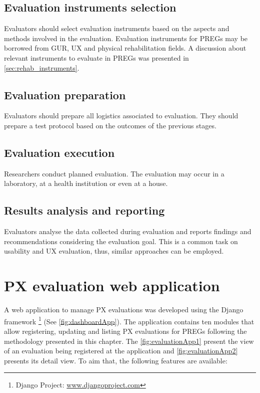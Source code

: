 \subsection{Evaluation instruments selection}
Evaluators should select evaluation instruments based on the aspects and methods involved in the evaluation. Evaluation instruments for \acp{PREG} may be borrowed from \ac{GUR}, \ac{UX} and physical rehabilitation fields. A discussion about relevant instruments to evaluate in \acp{PREG} was presented in \autoref{sec:rehab_instruments}.

\subsection{Evaluation preparation}
Evaluators should prepare all logistics associated to evaluation. They should prepare a test protocol based on the outcomes of the previous stages.

\subsection{Evaluation execution}
Researchers conduct planned evaluation. The evaluation may occur in a laboratory, at a health institution or even at a house.

\subsection{Results analysis and reporting}
Evaluators analyse the data collected during evaluation and reports findings and recommendations considering the evaluation goal. This is a common task on usability and UX evaluation, thus, similar approaches can be employed.










\section{PX evaluation web application}
A web application to manage \ac{PX} evaluations was developed using the Django framework \footnote{Django Project: \url{www.djangoproject.com}} (See \autoref{fig:dashboardApp}). The application contains ten modules that allow registering, updating and listing \ac{PX} evaluations for \acp{PREG} following the methodology presented in this chapter. The \autoref{fig:evaluationApp1} present the view of an evaluation being registered at the application and \autoref{fig:evaluationApp2} presents its detail view. To aim that, the following features are available:

